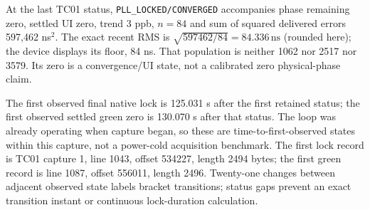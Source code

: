\documentclass[11pt,letterpaper]{article}
\newcommand{\ns}{\,\mathrm{ns}}
\newcommand{\code}[1]{\texttt{\small #1}}
\begin{document}
At the last TC01 status, \code{PLL\_LOCKED/CONVERGED} accompanies phase remaining zero, settled UI zero, trend 3 ppb, $n=84$ and sum of squared delivered errors 597,462 ns$^2$. The exact recent RMS is $\sqrt{597462/84}=84.336\ns$ (rounded here); the device displays its floor, 84 ns. That population is neither 1062 nor 2517 nor 3579. Its zero is a convergence/UI state, not a calibrated zero physical-phase claim.

The first observed final native lock is 125.031 s after the first retained status; the first observed settled green zero is 130.070 s after that status. The loop was already operating when capture began, so these are time-to-first-observed states within this capture, not a power-cold acquisition benchmark. The first lock record is TC01 capture 1, line 1043, offset 534227, length 2494 bytes; the first green record is line 1087, offset 556011, length 2496. Twenty-one changes between adjacent observed state labels bracket transitions; status gaps prevent an exact transition instant or continuous lock-duration calculation.
\end{document}

